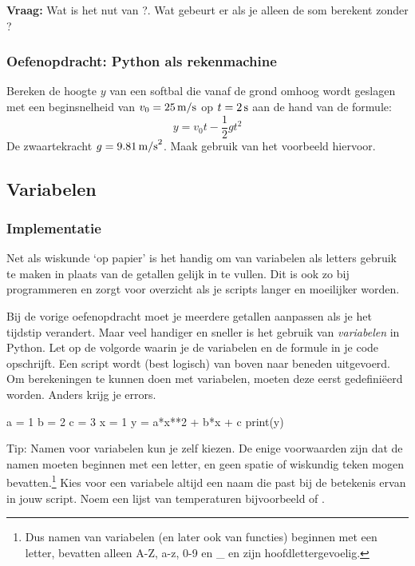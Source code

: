 \documentclass[a4paper,11pt, fleqn]{article}
\begin{document}
\textbf{Vraag:} Wat is het nut van ?. Wat gebeurt er als je alleen de som berekent zonder ?
\subsubsection*{Oefenopdracht: Python als rekenmachine} Bereken de hoogte $y$ van een softbal die vanaf de grond omhoog wordt geslagen met een beginsnelheid van $v_0 = 25 \, {\rm m/s}$ op $t = 2 \, {\rm s}$ aan de hand van de formule:
\begin{equation}
y = v_0 t - \frac{1}{2}g t^2
\label{eq-ball}
\end{equation}
De zwaartekracht $g = 9.81 \, {\rm m/s}^2$. Maak gebruik van het voorbeeld hiervoor.

\subsection{Variabelen}
\label{sec-vars}

\subsubsection{Implementatie}
Net als wiskunde `op papier' is het handig om van variabelen als letters gebruik te maken in plaats van de getallen gelijk in te vullen. Dit is ook zo bij programmeren en zorgt voor overzicht als je scripts langer en moeilijker worden.

Bij de vorige oefenopdracht moet je meerdere getallen aanpassen als je het tijdstip verandert. Maar veel handiger en sneller is het gebruik van {\it variabelen} in Python. Let op de volgorde waarin je de variabelen en de formule in je code opschrijft. Een script wordt (best logisch) van boven naar beneden uitgevoerd. Om berekeningen te kunnen doen met variabelen, moeten deze eerst gedefini\"eerd worden. Anders krijg je errors.

\begin{python}
a = 1
b = 2
c = 3
x = 1
y = a*x**2 + b*x + c
print(y)
\end{python}

Tip: Namen voor variabelen kun je zelf kiezen. De enige voorwaarden zijn dat de namen moeten beginnen met een letter, en geen spatie of wiskundig teken mogen bevatten.\footnote{Dus namen van variabelen (en later ook van functies) beginnen met een letter, bevatten alleen A-Z, a-z, 0-9 en \_ en zijn hoofdlettergevoelig.} Kies voor een variabele altijd een naam die past bij de betekenis ervan in jouw script. Noem een lijst van temperaturen bijvoorbeeld  of .
\end{document}
